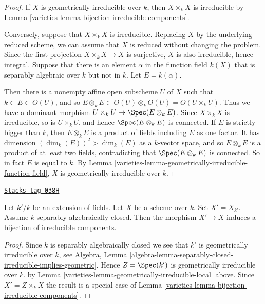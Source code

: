 \begin{proof}

If $X$ is geometrically irreducible over $k$,
then $X\times_k X$ is irreducible
by Lemma \ref{varieties-lemma-bijection-irreducible-components}.

\medskip\noindent
Conversely, suppose that $X \times_k X$ is irreducible. Replacing $X$
by the underlying reduced scheme, we can assume that $X$ is reduced
without changing the problem.
Since the first projection $X \times_k X \to X$
is surjective, $X$ is also irreducible, hence integral.
Suppose that there is an element
$\alpha$ in the function field $k(X)$ that is separably
algebraic over $k$ but not in $k$. Let $E = k(\alpha)$.

\medskip\noindent
Then there is a nonempty affine open subscheme $U$ of $X$ such that
$k \subset E \subset O(U)$, and so $E \otimes_k E \subset
O(U)\otimes_k O(U) = O(U\times_k U)$. Thus we have a dominant morphism
$U \times_k U \to \Spec(E\otimes_k E)$. Since $X\times_k X$ is irreducible,
so is $U \times_k U$, and hence $\Spec(E \otimes_k E)$ is connected.
If $E$ is strictly bigger than $k$, then $E \otimes_k E$
is a product of fields including $E$ as one factor. It has dimension
$(\dim_k(E))^2>\dim_k(E)$ as a $k$-vector space,
and so $E\otimes_k E$ is a product
of at least two fields, contradicting that $\Spec(E \otimes_k E)$
is connected. So in fact $E$ is equal to $k$.
By Lemma \ref{varieties-lemma-geometrically-irreducible-function-field},
$X$ is geometrically irreducible over $k$.
\end{proof}

\begin{lemma}
\label{varieties-lemma-separably-closed-field-irreducible-components}
\href{https://stacks.math.columbia.edu/tag/038H}{\texttt{Stacks tag 038H}}

Let $k'/k$ be an extension of fields.
Let $X$ be a scheme over $k$. Set $X' = X_{k'}$.
Assume $k$ separably algebraically closed.
Then the morphism $X' \to X$ induces a bijection of irreducible components.
\end{lemma}

\begin{proof}

Since $k$ is separably algebraically closed we see that
$k'$ is geometrically irreducible over $k$, see Algebra,
Lemma \ref{algebra-lemma-separably-closed-irreducible-implies-geometric}.
Hence $Z = \Spec(k')$ is geometrically irreducible over $k$.
by Lemma \ref{varieties-lemma-geometrically-irreducible-local} above.
Since $X' = Z \times_k X$ the result is a special case
of Lemma \ref{varieties-lemma-bijection-irreducible-components}.
\end{proof}

